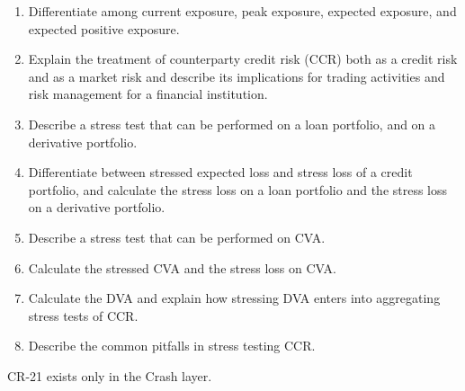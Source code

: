 
\begin{crkeybox}
\begin{enumerate}[label=\textbf{\alph*.},leftmargin=2em]
\item Differentiate among current exposure, peak exposure, expected exposure, and expected positive exposure.
\item Explain the treatment of counterparty credit risk (CCR) both as a credit risk and as a market risk and describe its implications for trading activities and risk management for a financial institution.
\item Describe a stress test that can be performed on a loan portfolio, and on a derivative portfolio.
\item Differentiate between stressed expected loss and stress loss of a credit portfolio, and calculate the stress loss on a loan portfolio and the stress loss on a derivative portfolio.
\item Describe a stress test that can be performed on CVA.
\item Calculate the stressed CVA and the stress loss on CVA.
\item Calculate the DVA and explain how stressing DVA enters into aggregating stress tests of CCR.
\item Describe the common pitfalls in stress testing CCR.
\end{enumerate}
\end{crkeybox}

\begin{crtrapbox}
CR-21 exists only in the Crash layer.
\end{crtrapbox}


